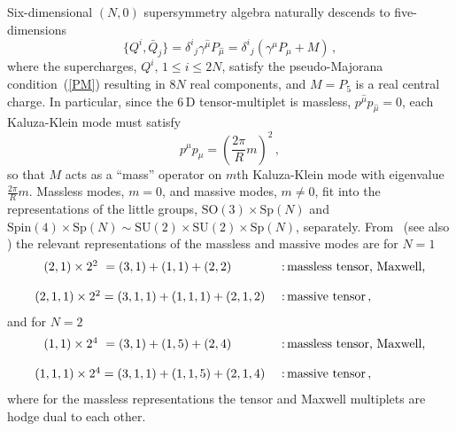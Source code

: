 \documentclass[a4paper,12pt]{article}
\begin{document}
Six-dimensional $(N,0)$ supersymmetry algebra naturally descends to five-dimensions
\begin{equation}
{}\{Q^{i},\bar{Q}_{j}\}=\delta^{i}{}_{j}\gamma^{\hat{\mu}}P_{\hat{\mu}}=\delta^{i}{}_{j}(\gamma^{\mu}P_{\mu}+M)\,,
\end{equation}
where the supercharges, $Q^{i},\,1\leq i\leq 2N$, satisfy the pseudo-Majorana condition~(\ref{PM}) resulting in  $8N$  real components, and  $M=P_{5}$ is a real central charge.  In particular,  
since the $6$\,D tensor-multiplet is massless, $p^{\hat{\mu}}p_{\hat{\mu}}=0$,  each Kaluza-Klein mode must satisfy
\begin{equation}
p^{\mu}p_{\mu}=(\textstyle{\frac{2\pi}{R}}m)^{2}\,,
\label{mass}
\end{equation}
so that  $M$ acts as a ``mass'' operator  on $m$th Kaluza-Klein mode  with eigenvalue $\frac{2\pi}{R}m$. Massless modes, $m=0$, and massive modes, $m\neq 0$,    fit into the representations of the   little groups, $\mbox{SO}(3)\times\mbox{Sp}(N)$ and $\mbox{Spin}(4)\times\mbox{Sp}(N)\sim
\mbox{SU}(2)\times\mbox{SU}(2)\times\mbox{Sp}(N)$, separately.  
From \cite{strathdee}~(see also \cite{0004086}) the relevant representations of the  massless and massive modes are for $N=1$
\begin{equation}
\begin{array}{cl}
(2,1)\times 2^{2}~=(3,1)+(1,1)+(2,2)~~~~~~~&\mbox{:\,massless~tensor,~Maxwell,}\\
{}&{}\\
(2,1,1)\times 2^{2}=(3,1,1)+(1,1,1)+(2,1,2)~&\mbox{:\,massive~tensor}\,,
\end{array}
\end{equation}
and for $N=2$
\begin{equation}
\begin{array}{cl}
(1,1)\times 2^{4}~=(3,1)+(1,5)+(2,4)~~~~~~~&\mbox{:\,massless~tensor,~Maxwell,}\\
{}&{}\\
(1,1,1)\times 2^{4}=(3,1,1)+(1,1,5)+(2,1,4)~&\mbox{:\,massive~tensor}\,,
\end{array}
\end{equation}
where for the massless representations the tensor and Maxwell multiplets are hodge dual to each other.









\end{document}
